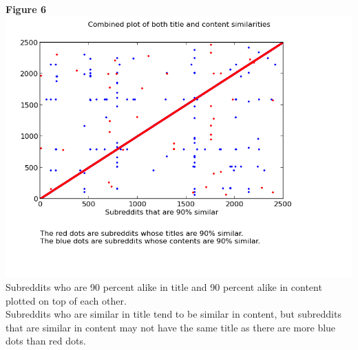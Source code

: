 \documentclass[10pt]{article}
\begin{document}
\textbf{Figure 6}\\
\includegraphics[scale=0.7]{match}\\
Subreddits who are 90 percent alike in title and 90 percent alike in content plotted on top of each other.\\
Subreddits who are similar in title tend to be similar in content, but subreddits that are similar in content may not have the same title as there are more blue dots than red dots.\\
\end{document}
